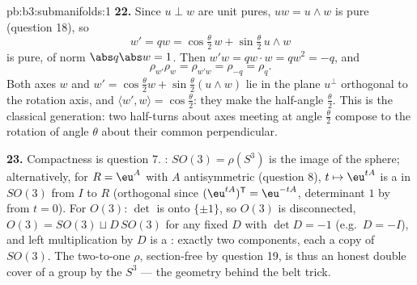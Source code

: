 \begin{solution}{pb:b3:submanifolds:1}
\textbf{22.} Since $u \perp w$ are unit pures, $uw =
u\wedge w$ is pure (question 18), so
\[
w' = qw = \cos\tfrac\theta2\,w + \sin\tfrac\theta2\,u\wedge
w
\]
is pure, of norm $\abs q\abs w = 1$. Then $w'w = qw\cdot w
= qw^2 = -q$, and
\[
\rho_{w'}\rho_w = \rho_{w'w} = \rho_{-q} = \rho_q .
\]
Both axes $w$ and $w' = \cos\frac\theta2 w +
\sin\frac\theta2(u\wedge w)$ lie in the plane $u^\perp$
orthogonal to the rotation axis, and $\langle w', w\rangle
= \cos\frac\theta2$: they make the half-angle
$\frac\theta2$. This is the classical generation: two
half-turns about axes meeting at angle $\frac\theta2$
compose to the rotation of angle $\theta$ about their
common perpendicular.

\textbf{23.} Compactness is question 7. :
$SO(3) = \rho(S^3)$ is the  image of the
 sphere; alternatively, for $R = \eu^{A}$
with $A$ antisymmetric (question 8), $t \mapsto \eu^{tA}$
is a  in $SO(3)$ from $I$ to $R$ (orthogonal since
$(\eu^{tA})^{\mathsf T} = \eu^{-tA}$, determinant $1$ by
 from $t = 0$). For $O(3)$: $\det$ is 
onto $\{\pm1\}$, so $O(3)$ is disconnected, $O(3) = SO(3)
\sqcup D\,SO(3)$ for any fixed $D$ with $\det D = -1$
(e.g.\ $D = -I$), and left multiplication by $D$ is a
: exactly two components, each a copy of
$SO(3)$. The two-to-one $\rho$, section-free by question
19, is thus an honest double cover of a  
group by the  $S^3$ --- the geometry behind
the belt trick.


\end{solution}
